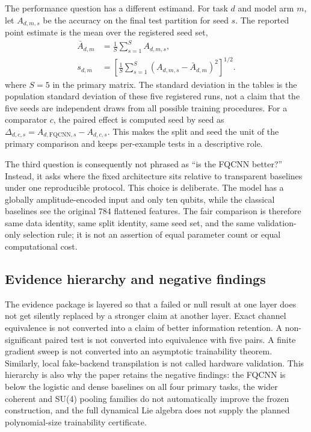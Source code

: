 \documentclass[conference]{IEEEtran}
\begin{document}
The performance question has a different estimand. For task $d$ and model arm
$m$, let $A_{d,m,s}$ be the accuracy on the final test partition for seed $s$.
The reported point estimate is the mean over the registered seed set,
\begin{equation}
\begin{aligned}
\bar{A}_{d,m}&=\frac{1}{S}\sum_{s=1}^{S}A_{d,m,s},\\
s_{d,m}&=\left[\frac{1}{S}\sum_{s=1}^{S}
\left(A_{d,m,s}-\bar{A}_{d,m}\right)^2\right]^{1/2}.
\end{aligned}
\label{eq:seedestimand}
\end{equation}
where $S=5$ in the primary matrix. The standard deviation in the tables is the
population standard deviation of these five registered runs, not a claim that
the five seeds are independent draws from all possible training procedures.
For a comparator $c$, the paired effect is computed seed by seed as
$\Delta_{d,c,s}=A_{d,\mathrm{FQCNN},s}-A_{d,c,s}$. This makes the split and seed
the unit of the primary comparison and keeps per-example tests in a descriptive
role.

The third question is consequently not phrased as ``is the FQCNN better?''
Instead, it asks where the fixed architecture sits relative to transparent
baselines under one reproducible protocol. This choice is deliberate. The
model has a globally amplitude-encoded input and only ten qubits, while the
classical baselines see the original 784 flattened features. The fair comparison
is therefore same data identity, same split identity, same seed set, and the
same validation-only selection rule; it is not an assertion of equal parameter
count or equal computational cost.

\subsection{Evidence hierarchy and negative findings}
The evidence package is layered so that a failed or null result at one layer
does not get silently replaced by a stronger claim at another layer. Exact
channel equivalence is not converted into a claim of better information
retention. A non-significant paired test is not converted into equivalence with
five pairs. A finite gradient sweep is not converted into an asymptotic
trainability theorem. Similarly, local fake-backend transpilation is not called
hardware validation. This hierarchy is also why the paper retains
the negative findings: the FQCNN is below the logistic and dense baselines on
all four primary tasks, the wider coherent and SU(4) pooling families do not
automatically improve the frozen construction, and the full dynamical Lie
algebra does not supply the planned polynomial-size trainability certificate.
\end{document}
